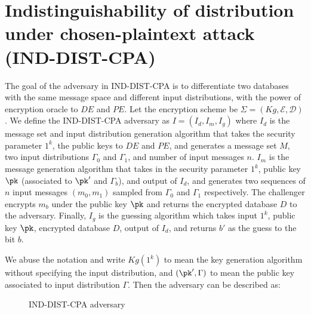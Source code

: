 \section{Indistinguishability of distribution under chosen-plaintext attack (IND-DIST-CPA)}
The goal of the adversary in IND-DIST-CPA is to differentiate two databases with the same message space and different input distributions, with the power of encryption oracle to $DE$ and $PE$. Let the encryption scheme be $\Sigma = (Kg, \mathcal{E}, \mathcal{D})$. We define the IND-DIST-CPA adversary as $I = (I_d, I_m, I_g)$ where $I_d$ is the message set and input distribution generation algorithm that takes the security parameter $1^k$, the public keys to $DE$ and $PE$, and generates a message set $M$, two input distributions $\Gamma_0$ and $\Gamma_1$, and number of input messages $n$. $I_m$ is the message generation algorithm that takes in the security parameter $1^k$, public key $\pk$ (associated to $\pk'$ and $\Gamma_b$), and output of $I_d$, and generates two sequences of $n$ input messages $(m_0, m_1)$ sampled from $\Gamma_0$ and $\Gamma_1$ respectively. The challenger encrypts $m_b$ under the public key $\pk$ and returns the encrypted database $D$ to the adversary. Finally, $I_g$ is the guessing algorithm which takes input $1^k$, public key $\pk$, encrypted database $D$, output of $I_d$, and returns $b'$ as the guess to the bit $b$.

We abuse the notation and write $Kg(1^k)$ to mean the key generation algorithm without specifying the input distribution, and $(\pk', \Gamma)$ to mean the public key associated to input distribution $\Gamma$. Then the adversary can be described as:
\begin{figure}[H]
	\begin{center}
	\end{center}
	\caption{IND-DIST-CPA adversary}
\end{figure}

